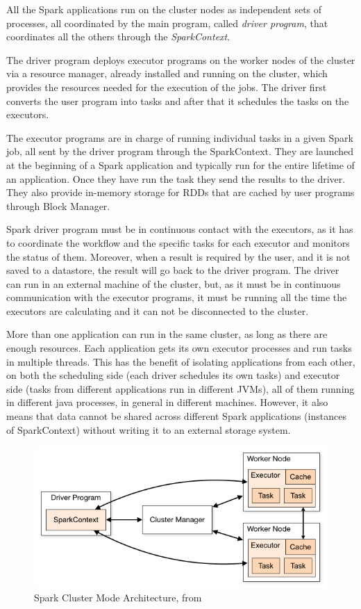 \documentclass[11pt]{book} %
\begin{document}
      All the Spark applications run on the cluster nodes as independent sets of processes, all coordinated by the main program, called \emph{driver program}, that coordinates all the others through the \emph{SparkContext}.

      The driver program deploys executor programs on the worker nodes of the cluster via a resource manager, already installed and running on the cluster, which provides the resources needed for the execution of the jobs. The driver first converts the user program into tasks and after that it schedules the tasks on the executors.

      The executor programs are in charge of running individual tasks in a given Spark job, all sent by the driver program through the SparkContext. They are launched at the beginning of a Spark application and typically run for the entire lifetime of an application. Once they have run the task they send the results to the driver. They also provide in-memory storage for RDDs that are cached by user programs through Block Manager.

      Spark driver program must be in continuous contact with the executors, as it has to coordinate the workflow and the specific tasks for each executor and monitors the status of them. Moreover, when a result is required by the user, and it is not saved to a datastore, the result will go back to the driver program. The driver can run in an external machine of the cluster, but, as it must be in continuous communication with the executor programs, it must be running all the time the executors are calculating and it can not be disconnected to the cluster.

      More than one application can run in the same cluster, as long as there are enough resources. Each application gets its own executor processes and run tasks in multiple threads. This has the benefit of isolating applications from each other, on both the scheduling side (each driver schedules its own tasks) and executor side (tasks from different applications run in different JVMs), all of them running in different java processes, in general in different machines. However, it also means that data cannot be shared across different Spark applications (instances of SparkContext) without writing it to an external storage system.

      \begin{figure}[!ht]
        \centering
        \includegraphics[width=\textwidth]{cluster-overview.png}
        \caption{Spark Cluster Mode Architecture, from \cite{Spark_documentation}}
        \label{img:Spark_architecture}
      \end{figure}
\end{document}
